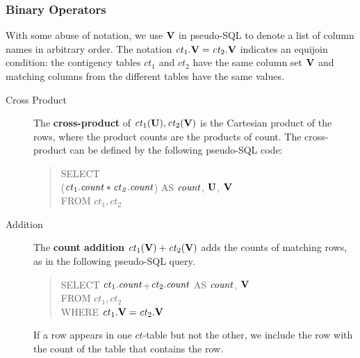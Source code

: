 \documentclass{vldb}
\newcommand{\ct}{\mathit{ct}}
\begin{document}
\subsubsection{Binary Operators} \label{sec:bin}
With some abuse of notation, we use $\mathbf{V}$ in pseudo-SQL to denote a list of column names in arbitrary order. The notation $\ct_{1}.\set{V} = \ct_{2}.\set{V}$ indicates an equijoin condition: the contigency tables $\ct_{1}$ and $\ct_{2}$ have the same column set $\mathbf{V}$ and matching columns from the different tables have the same values.
\begin{description}
\item[Cross Product]  %
The \textbf{cross-product} of $\ct_{1}(\set{U}),\ct_{2}(\set{V})$ is the Cartesian product of the rows, where the product counts are the products of count. The cross-product can be defined by the following pseudo-SQL code:
\begin{quote}
SELECT \\($\ct_{1}.\qcount *\ct_{2}.\qcount$) AS $\it{count}$,  $\mathbf{U}$, $\mathbf{V}$\\
FROM  $\ct_{1},\ct_{2}$
\end{quote}


\item[Addition] 
 The \textbf{count addition} $\ct_{1}(\set{V}) + \ct_{2}(\set{V})$ adds the counts of matching rows, as in the following pseudo-SQL query.
\begin{quote}
SELECT %
$\ct_{1}.\qcount$+$\ct_{2}.\qcount$ AS $\it{count}$, $\mathbf{V}$ \\%
FROM  $\ct_{1},\ct_{2}$\\
WHERE $\ct_{1}.\set{V} = \ct_{2}.\set{V}$
\end{quote}

If a row appears in one $\ct$-table but not the other, we include the row with the count of the table that contains the row. %


\end{description}
\end{document}

